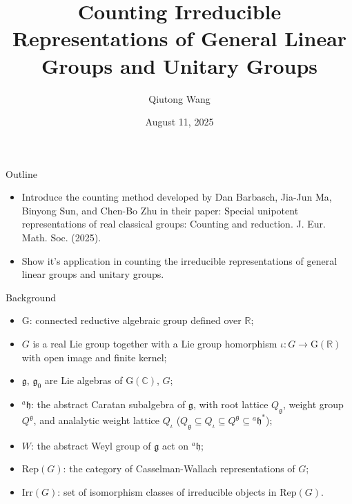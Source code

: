 \documentclass{beamer}
\title[]{Counting Irreducible Representations of General Linear Groups and Unitary Groups}
\author{Qiutong Wang}
\institute{Zhejiang University}
\date{August 11, 2025}
\newcommand{\BC}{{\mathbb {C}}}
\newcommand{\BR}{{\mathbb {R}}}
\newcommand{\RG}{{\mathrm {G}}}
\newcommand{\fg}{\mathfrak{g}}
\newcommand{\fh}{\mathfrak{h}}
\begin{document}
\begin{frame}
  \titlepage
\end{frame}




\begin{frame}{Outline}

\begin{itemize}
  \item Introduce the counting method developed by Dan Barbasch, Jia-Jun Ma, Binyong Sun, and Chen-Bo Zhu in their paper: Special unipotent representations of real classical groups: Counting and reduction. J. Eur. Math. Soc. (2025). 
  \item Show it's application in counting the irreducible representations of general linear groups and unitary groups.
\end{itemize}
\end{frame}












\begin{frame}{Background}
  \begin{itemize}
    \item $\RG$: connected reductive algebraic group defined over $\BR$;
    \item $G$ is a real Lie group together with a Lie group homorphism $\iota: G \to \RG(\BR)$ with open image and finite kernel;
    \item $\fg$, $\fg_0$ are Lie algebras of $\RG(\BC)$, $G$;
    \item $^{a}\fh$: the abstract Caratan subalgebra of $\fg$, with root lattice $Q_{\fg}$, weight group $Q^{\fg}$, and analalytic weight lattice $Q_{\iota}$ ($Q_{\fg} \subseteq Q_{\iota} \subseteq Q^{\fg} \subseteq {^{a}\fh}^*$);
    \item $W$: the abstract Weyl group of $\fg$ act on $^{a}\fh$;
    \item $\mathrm{Rep}(G)$: the category of Casselman-Wallach representations of $G$;
    \item $\mathrm{Irr}(G)$: set of isomorphism classes of irreducible objects in $\mathrm{Rep}(G)$.
  \end{itemize}
  




\end{frame}
\end{document}
